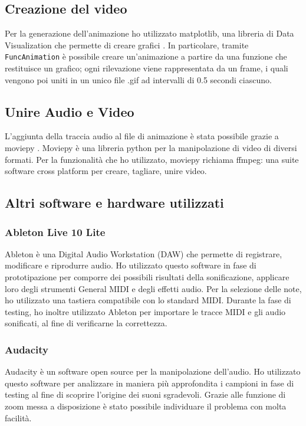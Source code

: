 \subsection{Creazione del video}
Per la generazione dell'animazione ho utilizzato matplotlib, una libreria di Data Visualization che permette di creare grafici \cite{matplotlib}.
In particolare, tramite \texttt{FuncAnimation} è possibile creare un'animazione a partire da una funzione che restituisce un grafico;
ogni rilevazione viene rappresentata da un frame, i quali vengono poi uniti in un unico file .gif ad intervalli di 0.5 secondi ciascuno.

\subsection{Unire Audio e Video}
L'aggiunta della traccia audio al file di animazione è stata possibile grazie a moviepy \cite{moviepy}.
Moviepy è una libreria python per la manipolazione di video di diversi formati.
Per la funzionalità che ho utilizzato, moviepy richiama ffmpeg: una suite software cross platform per creare, tagliare, unire video.

\subsection{Altri software e hardware utilizzati}
\subsubsection{Ableton Live 10 Lite}
Ableton è una Digital Audio Workstation (DAW) che permette di registrare, modificare e riprodurre audio.
Ho utilizzato questo software in fase di prototipazione per comporre dei possibili risultati della sonificazione, applicare loro degli strumenti General MIDI e degli effetti audio.
Per la selezione delle note, ho utilizzato una tastiera compatibile con lo standard MIDI.
Durante la fase di testing, ho inoltre utilizzato Ableton per importare le tracce MIDI e gli audio sonificati, al fine di verificarne la correttezza.
\subsubsection{Audacity}
Audacity è un software open source per la manipolazione dell'audio.
Ho utilizzato questo software per analizzare in maniera più approfondita i campioni in fase di testing al fine di scoprire l'origine dei suoni sgradevoli.
Grazie alle funzione di zoom messa a disposizione è stato possibile individuare il problema con molta facilità.
